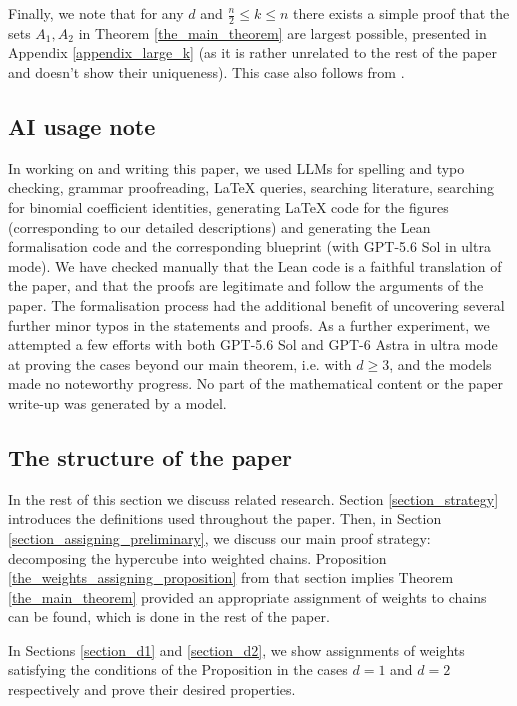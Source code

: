 \documentclass[11pt, reqno]{amsart}
\theoremstyle{remark}
\numberwithin{equation}{section}
\begin{document}
Finally, we note that for any $d$ and $\frac{n}{2} \leqslant k \leqslant n$ there exists a simple proof that the sets $A_1, A_2$ in Theorem \ref{the_main_theorem} are largest possible, presented in Appendix \ref{appendix_large_k} (as it is rather unrelated to the rest of the paper and doesn't show their uniqueness). This case also follows from \cite[Theorem 5.1]{tour_m_part_p_sperner_families}.

\subsection{AI usage note}
In working on and writing this paper, we used LLMs for spelling and typo checking, grammar proofreading, \LaTeX{} queries, searching literature, searching for binomial coefficient identities, generating \LaTeX{} code for the figures (corresponding to our detailed descriptions) and generating the Lean formalisation code and the corresponding blueprint (with GPT-5.6 Sol in ultra mode). We have checked manually that the Lean code is a faithful translation of the paper, and that the proofs are legitimate and follow the arguments of the paper. The formalisation process had the additional benefit of uncovering several further minor typos in the statements and proofs. As a further experiment, we attempted a few efforts with both GPT-5.6 Sol and GPT-6 Astra in ultra mode at proving the cases beyond our main theorem, i.e. with $d \geqslant 3$, and the models made no noteworthy progress. No part of the mathematical content or the paper write-up was generated by a model.

\subsection{The structure of the paper}
In the rest of this section we discuss related research. Section \ref{section_strategy} introduces the definitions used throughout the paper. Then, in Section \ref{section_assigning_preliminary}, we discuss our main proof strategy: decomposing the hypercube into weighted chains. Proposition \ref{the_weights_assigning_proposition} from that section implies Theorem \ref{the_main_theorem} provided an appropriate assignment of weights to chains can be found, which is done in the rest of the paper.

In Sections \ref{section_d1} and \ref{section_d2}, we show assignments of weights satisfying the conditions of the Proposition in the cases $d=1$ and $d=2$ respectively and prove their desired properties.
\end{document}
